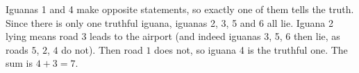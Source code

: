 Iguanas 1 and 4 make opposite statements, so exactly one of them tells the truth. Since there is only one truthful iguana, iguanas 2, 3, 5 and 6 all lie. Iguana 2 lying means road $3$ leads to the airport (and indeed iguanas 3, 5, 6 then lie, as roads $5$, $2$, $4$ do not). Then road $1$ does not, so iguana 4 is the truthful one. The sum is $4+3=\boxed{7}$.
